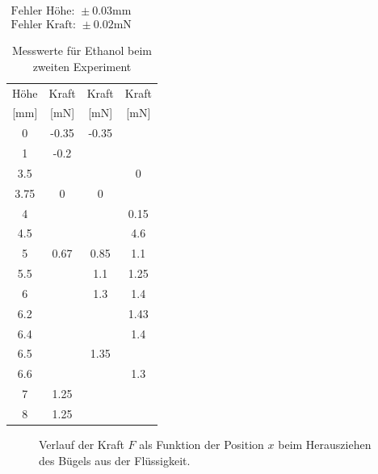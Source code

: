 \documentclass[11pt,a4paper]{article}
\begin{document}
\begin{table}[h]
\centering
$\begin{array}{l}
\textrm{Fehler Höhe: } \pm 0.03 \textrm{mm}\\
\textrm{Fehler Kraft: } \pm 0.02 \textrm{mN}
\end{array}$
\begin{tabular}{|c|c|c|c|}
\hline
\textrm{H\"ohe}& \textrm{Kraft} & \textrm{Kraft} & \textrm{Kraft} \\
\textrm{[mm]} & \textrm{[mN]}& \textrm{[mN]}& \textrm{[mN]} \\
\hline 
0 & -0.35 & -0.35 & \\
\hline
1 & -0.2 & & \\
\hline 
3.5 & & & 0\\
\hline 
3.75 & 0 & 0 & \\
\hline 
4 & & & 0.15\\ 
\hline
4.5 & & & 4.6\\ 
\hline
5 & 0.67 & 0.85 & 1.1\\ 
\hline
5.5 & & 1.1 & 1.25\\ 
\hline
6 & & 1.3 & 1.4\\ 
\hline 
6.2 & & & 1.43\\ 
\hline
6.4 & & & 1.4\\ 
\hline
6.5 & & 1.35 & \\ 
\hline
6.6 & & & 1.3\\ 
\hline
7 & 1.25 & & \\ 
\hline
8 & 1.25 & &\\
\hline
\end{tabular}
\caption{Messwerte für Ethanol beim zweiten Experiment}
\label{tabme}
\end{table}

\begin{figure}[p]
\centering
{}
\caption{Verlauf der Kraft $F$ als Funktion der Position $x$ beim Herausziehen des B\"ugels aus der Fl\"ussigkeit.}
\label{ab3}
\end{figure}
\end{document}
